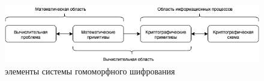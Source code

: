 \begin{figure}[ht]
  \centering
  \includegraphics[scale=0.7]{share/el.png}
  \caption{элементы системы гомоморфного шифрования}
  \label{fig:struct}
\end{figure}
